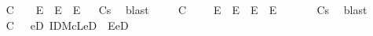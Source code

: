\begin{isabellebody}
%
\endisadelimproof
\isanewline
\ \ \ \isamarkupfalse%
\ C\ {\isachardoublequoteopen}\isactrlbold {\isasymforall}{\isasymgamma}\ {\isasymbeta}\ {\isasymalpha}{\isachardot}\ {\isacharparenleft}E{\isacharparenleft}{\isasymbeta}{\isasymcdot}{\isasymalpha}{\isacharparenright}\ \isactrlbold {\isasymand}\ E{\isacharparenleft}{\isasymgamma}{\isasymcdot}{\isacharparenleft}{\isasymbeta}{\isasymcdot}{\isasymalpha}{\isacharparenright}{\isacharparenright}{\isacharparenright}\ \isactrlbold {\isasymrightarrow}\ E{\isacharparenleft}{\isasymgamma}{\isasymcdot}{\isasymbeta}{\isacharparenright}{\isachardoublequoteclose}%
\isadelimproof
\ %
\endisadelimproof
%
\isatagproof
{}\isamarkupfalse%
\ Cs\ \isamarkupfalse%
\ blast%
\endisatagproof
{\isafoldproof}%
%
\isadelimproof
%
\endisadelimproof
\isanewline
\ \ \ \isamarkupfalse%
\ C\ {\isacharcolon}\ {\isachardoublequoteopen}\isactrlbold {\isasymforall}{\isasymgamma}\ {\isasymbeta}\ {\isasymalpha}{\isachardot}\ {\isacharparenleft}E{\isacharparenleft}{\isasymgamma}{\isasymcdot}{\isasymbeta}{\isacharparenright}\ \isactrlbold {\isasymand}\ E{\isacharparenleft}{\isasymbeta}{\isasymcdot}{\isasymalpha}{\isacharparenright}{\isacharparenright}\ \isactrlbold {\isasymrightarrow}\ {\isacharparenleft}E{\isacharparenleft}{\isacharparenleft}{\isasymgamma}{\isasymcdot}{\isasymbeta}{\isacharparenright}{\isasymcdot}{\isasymalpha}{\isacharparenright}\ \isactrlbold {\isasymand}\ E{\isacharparenleft}{\isasymgamma}{\isasymcdot}{\isacharparenleft}{\isasymbeta}{\isasymcdot}{\isasymalpha}{\isacharparenright}{\isacharparenright}\ \isactrlbold {\isasymand}\ {\isacharparenleft}{\isacharparenleft}{\isasymgamma}{\isasymcdot}{\isasymbeta}{\isacharparenright}{\isasymcdot}{\isasymalpha}{\isacharparenright}\ {\isacharequal}\ {\isacharparenleft}{\isasymgamma}{\isasymcdot}{\isacharparenleft}{\isasymbeta}{\isasymcdot}{\isasymalpha}{\isacharparenright}{\isacharparenright}{\isacharparenright}{\isachardoublequoteclose}%
\isadelimproof
\ %
\endisadelimproof
%
\isatagproof
{}\isamarkupfalse%
\ Cs\ \isamarkupfalse%
\ blast%
\endisatagproof
{\isafoldproof}%
%
\isadelimproof
%
\endisadelimproof
\isanewline
\ \ \ \isamarkupfalse%
\ C\ {\isacharcolon}\ {\isachardoublequoteopen}\isactrlbold {\isasymforall}{\isasymgamma}{\isachardot}\ \isactrlbold {\isasymexists}eD{\isachardot}\ IDMcL{\isacharparenleft}eD{\isacharparenright}\ \isactrlbold {\isasymand}\ E{\isacharparenleft}{\isasymgamma}{\isasymcdot}eD{\isacharparenright}{\isachardoublequoteclose}%

\end{isabellebody}
